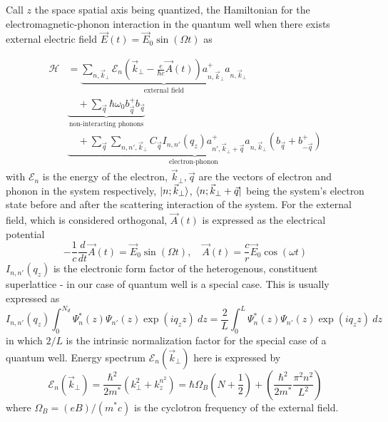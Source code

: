 \documentclass{article}
\begin{document}
Call $z$ the space spatial axis being quantized, the Hamiltonian for the electromagnetic-phonon interaction in the quantum well when there exists external electric field $\vec{E}(t)=\vec{E}_{0}\sin{(\Omega t)}$ as 

\begin{align}
    \mathcal{H}& = \underbrace{\sum_{n,\vec{k}_{\perp}} \mathcal{E}_{n}\left(\vec{k}_{\perp} - \frac{e}{\hbar c} \vec{A}(t)\right)a^{+}_{n,\vec{k}_{\perp}} a_{n,\vec{k}_{\perp}} }_{\text{external field}} \\ 
    & \underbrace{\quad + \sum_{\vec{q}} \hbar \omega_{0} b_{\vec{q}}^{+} b_{\vec{q}}}_{\text{non-interacting phonons} } \\
    & \underbrace{\quad + \sum_{\vec{q}} \sum_{n,n', \vec{k}_{\perp}} C_{\vec{q}} I_{n,n'}(q_{z}) a^{+}_{n',\vec{k}_{\perp}+\vec{q}} a_{n,\vec{k}_{\perp}} \left(b_{\vec{q}} + b^{+}_{- \vec{q}}\right)}_{\text{electron-phonon }}
\end{align}
with $\mathcal{E}_{n}$ is the energy of the electron, $\vec{k}_{\perp}, \vec{q}$ are the vectors of electron and phonon in the system respectively, $\ket{n; \vec{k}_{\perp}}$, $\bra{n;\vec{k}_{\perp}+\vec{q}}$ being the system's electron state before and after the scattering interaction of the system. For the external field, which is considered orthogonal, $\vec{A}(t)$ is expressed as the electrical potential 
\begin{equation}
    -\frac{1}{c} \frac{d}{dt} \vec{A}(t) = \vec{E}_{0}\sin{(\Omega t)},\quad  \vec{A}(t) = \frac{c}{r} \vec{E}_{0}\cos{(\omega t )}
\end{equation}
$I_{n,n'}(q_{z})$ is the electronic form factor of the heterogenous, constituent superlattice - in our case of quantum well is a special case. This is usually expressed as 
\begin{equation}
    I_{n,n'}(q_{z}) \int_{0}^{N_{d}} \Psi^{*}_{n}(z) \Psi_{n'}(z)\exp{(iq_{z}z)}\: dz = \frac{2}{L} \int_{0}^{L} \Psi^{*}_{n}(z)\Psi_{n'}(z)\exp{(iq_{z}z)}\: dz
\end{equation}
in which $2/L$ is the intrinsic normalization factor for the special case of a quantum well. Energy spectrum $\mathcal{E}_{n}(\vec{k}_{\perp})$ here is expressed by 
\begin{equation}
    \mathcal{E}_{n}(\vec{k}_{\perp}) = \frac{\hbar^{2}}{2m^{*}} \left( k_{\perp}^{2} + k_{z}^{n^{2}} \right) = \hbar \Omega_{B} \left(N + \frac{1}{2}\right) + \left(\frac{\hbar^{2}}{2m^{*}} \frac{\pi^{2}n^{2}}{L^{2}}\right)
\end{equation}
where $\Omega_{B}=(eB)/(m^{*}c)$ is the cyclotron frequency of the external field. 
\end{document}
